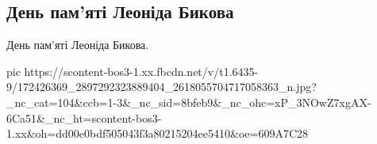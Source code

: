  
 
 
 
 

\subsection{День пам'яті Леоніда Бикова}
\label{sec:11_04_2021.fb.makarenko_oksana.1.bykov_leonid}

День пам'яті Леоніда Бикова.

\ifcmt
  pic https://scontent-bos3-1.xx.fbcdn.net/v/t1.6435-9/172426369_2897292323889404_2618055704717058363_n.jpg?_nc_cat=104&ccb=1-3&_nc_sid=8bfeb9&_nc_ohc=xP_3NOwZ7xgAX-6Ca51&_nc_ht=scontent-bos3-1.xx&oh=dd00e0bdf505043f3a80215204ee5410&oe=609A7C28
\fi

